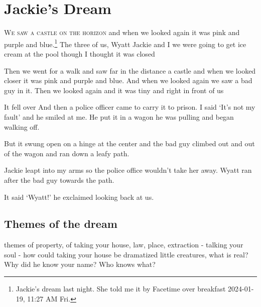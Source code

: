 
\chapter{Jackie's Dream}
\lettrine{W}{e saw a castle on the horizon} and when we looked again it was pink and purple and blue.\footnote{Jackie's dream last night. She told me it by Facetime over breakfast 2024-01-19, 11:27 AM Fri.} The three of us, Wyatt Jackie and I 
 we were going to get ice cream at the pool though I thought it was closed

Then we went for a walk and saw far in the distance a castle and when we looked closer it was pink and purple and blue.  And when we looked again we saw a bad guy in it. 
Then we looked again and it was tiny and right in front of us

It fell over 
And then a police officer came to carry it to prison. 
I said `It's not my fault' and he smiled at me. 
He put it in a wagon he was pulling and began walking off. 

But it swung open on a hinge at the center and the bad guy climbed out and out of the wagon and ran down a leafy path. 

Jackie leapt into my arms so the police office wouldn't take her away.
Wyatt ran after the bad guy towards the path.

It said `Wyatt!' he exclaimed looking back at us.


\section{Themes of the dream}

themes of property, of taking your house, law, place, extraction - talking your soul - how could taking your house be dramatized
little creatures, what is real? Why did he know your name? Who knows what?